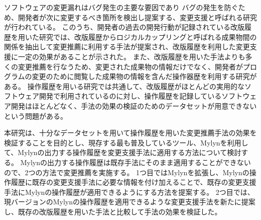 ソフトウェアの変更漏れはバグ発生の主要な要因であり
バグの発生を防ぐため、開発者が次に変更するべき箇所を検出し提案する、変更支援と呼ばれる研究が行われている。
このうち、開発者の過去の開発行動が記録されている改版履歴を用いた研究では、改版履歴からロジカルカップリングと呼ばれる成果物間の関係を抽出して変更推薦に利用する手法が提案され、改版履歴を利用した変更支援に一定の効果があることが示された。
また、改版履歴を用いた手法よりも多くの変更推薦を行なうため、変更された成果物の情報だけでなく、開発者がプログラムの変更のために閲覧した成果物の情報を含んだ操作器歴を利用する研究がある。
操作履歴を用いる研究では共通して、改版履歴がほとんどの実用的なソフトウェア開発で利用されているのに対し、操作履歴を記録しているソフトウェア開発はほとんどなく、手法の効果の検証のためのデータセットが用意できないという問題がある。

本研究は、十分なデータセットを用いて操作履歴を用いた変更推薦手法の効果を検証することを目的とし、現存する最も普及しているツール、Mylynを利用して、Mylynの出力する操作履歴を変更支援手法に適用する方法について検討する。
Mylynの出力する操作履歴は既存手法にそのまま適用することができないので、2つの方法で変更推薦を実施する。
1つ目ではMylynを拡張し、Mylynの操作履歴に既存の変更支援手法に必要な情報を付け加えることで、既存の変更支援手法にMylynの操作履歴が適用できるようにする方法を提案する。
2つ目では、現バージョンのMylynの操作履歴を適用できるような変更支援手法を新たに提案し、既存の改版履歴を用いた手法と比較して手法の効果を検証した。


